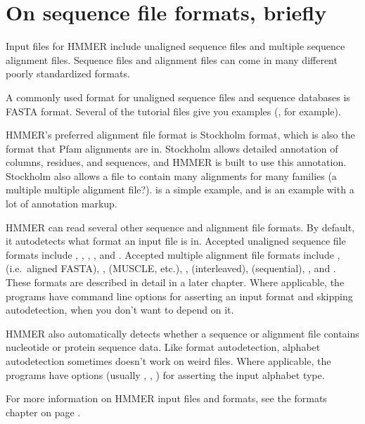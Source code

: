 \section{On sequence file formats, briefly}

Input files for HMMER include unaligned sequence files and multiple
sequence alignment files. Sequence files and alignment files can come
in many different poorly standardized formats.

A commonly used format for unaligned sequence files and sequence
databases is FASTA format. Several of the tutorial files give you
examples (, for example).

HMMER's preferred alignment file format is Stockholm format, which is
also the format that Pfam alignments are in.  Stockholm allows
detailed annotation of columns, residues, and sequences, and HMMER is
built to use this annotation. Stockholm also
allows a file to contain many alignments for many families (a multiple
multiple alignment file?).  is a simple example,
and  is an example with a lot of annotation markup.

HMMER can read several other sequence and alignment file formats. By
default, it autodetects what format an input file is in.  Accepted
unaligned sequence file formats include , ,
, , and . Accepted multiple
alignment file formats include , 
(i.e.\ aligned FASTA), ,  (MUSCLE,
etc.), ,  (interleaved), 
(sequential), , and . These formats are
described in detail in a later chapter. Where applicable, the programs
have command line options for asserting an input format and skipping
autodetection, when you don't want to depend on it.

HMMER also automatically detects whether a sequence or alignment file
contains nucleotide or protein sequence data. Like format
autodetection, alphabet autodetection sometimes doesn't work on weird
files. Where applicable, the programs have options (usually
, , ) for asserting the
input alphabet type.

For more information on HMMER input files and formats, see the formats
chapter on page \pageref{chapter:formats}.
 

